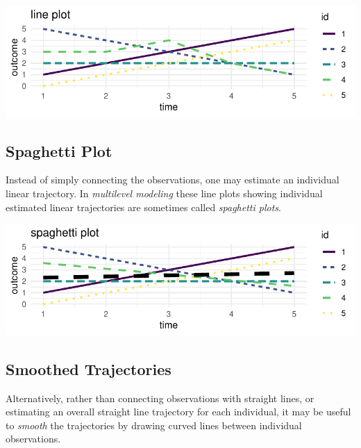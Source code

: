 \documentclass[
  letterpaper,
  DIV=11,
  numbers=noendperiod,
  oneside]{scrartcl}
\begin{document}
\includegraphics{index_files/figure-pdf/unnamed-chunk-3-1.pdf}

\subsection{Spaghetti Plot}\label{spaghetti-plot}

Instead of simply connecting the observations, one may estimate an
individual linear trajectory. In \emph{multilevel modeling} these line
plots showing individual estimated linear trajectories are sometimes
called \emph{spaghetti plots}.

\includegraphics{index_files/figure-pdf/unnamed-chunk-4-1.pdf}

\subsection{Smoothed Trajectories}\label{smoothed-trajectories}

Alternatively, rather than connecting observations with straight lines,
or estimating an overall straight line trajectory for each individual,
it may be useful to \emph{smooth} the trajectories by drawing curved
lines between individual observations.

\end{document}
